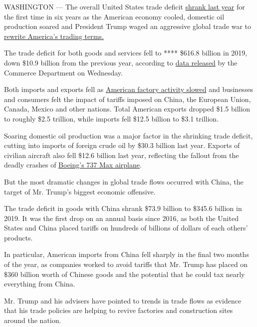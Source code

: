 WASHINGTON --- The overall United States trade deficit
\href{https://www.census.gov/foreign-trade/Press-Release/current_press_release/ft900.pdf}{shrank
last year} for the first time in six years as the American economy
cooled, domestic oil production soared and President Trump waged an
aggressive global trade war to
\href{https://www.nytimes3xbfgragh.onion/2020/01/15/business/economy/china-trade-deal.html}{rewrite
America's trading terms.}

The trade deficit for both goods and services fell to **** \$616.8
billion in 2019, down \$10.9 billion from the previous year, according
to
\href{https://www.census.gov/foreign-trade/Press-Release/current_press_release/index.html}{data
released} by the Commerce Department on Wednesday.

Both imports and exports fell as
\href{https://www.nytimes3xbfgragh.onion/2019/09/03/business/economy/manufacturing-economy-slowdown.html}{American
factory activity slowed} and businesses and consumers felt the impact of
tariffs imposed on China, the European Union, Canada, Mexico and other
nations. Total American exports dropped \$1.5 billion to roughly \$2.5
trillion, while imports fell \$12.5 billion to \$3.1 trillion.

Soaring domestic oil production was a major factor in the shrinking
trade deficit, cutting into imports of foreign crude oil by \$30.3
billion last year. Exports of civilian aircraft also fell \$12.6 billion
last year, reflecting the fallout from the deadly crashes of
\href{https://www.nytimes3xbfgragh.onion/2020/01/29/business/boeing-737-max-costs.html}{Boeing's
737 Max airplane}.

But the most dramatic changes in global trade flows occurred with China,
the target of Mr. Trump's biggest economic offensive.

The trade deficit in goods with China shrank \$73.9 billion to \$345.6
billion in 2019. It was the first drop on an annual basis since 2016, as
both the United States and China placed tariffs on hundreds of billions
of dollars of each others' products.

In particular, American imports from China fell sharply in the final two
months of the year, as companies worked to avoid tariffs that Mr. Trump
has placed on \$360 billion worth of Chinese goods and the potential
that he could tax nearly everything from China.

Mr. Trump and his advisers have pointed to trends in trade flows as
evidence that his trade policies are helping to revive factories and
construction sites around the nation.

